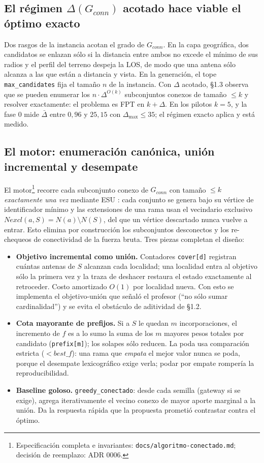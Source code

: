 \documentclass[12pt,letterpaper]{article}
\begin{document}
\subsection{El régimen $\Delta(G_{conn})$ acotado hace viable el óptimo exacto}
Dos rasgos de la instancia acotan el grado de $G_{conn}$. En la capa geográfica, dos candidatos se enlazan sólo si la distancia entre ambos no excede el mínimo de sus radios y el perfil del terreno despeja la LOS, de modo que una antena sólo alcanza a las que están a distancia y vista. En la generación, el tope \texttt{max\_candidates} fija el tamaño $n$ de la instancia. Con $\Delta$ acotado, \cite{itcs2026} §1.3 observa que se pueden enumerar los $n \cdot \Delta^{O(k)}$ subconjuntos conexos de tamaño $\le k$ y resolver exactamente: el problema es FPT en $k + \Delta$. En los pilotos $k = 5$, y la fase 0 mide $\bar{\Delta}$ entre $0{,}96$ y $25{,}15$ con $\Delta_{\max} \le 35$; el régimen exacto aplica y está medido.

\subsection{El motor: enumeración canónica, unión incremental y desempate}
El motor\footnote{Especificación completa e invariantes: \texttt{docs/algoritmo-conectado.md}; decisión de reemplazo: ADR 0006.} recorre cada subconjunto conexo de $G_{conn}$ con tamaño $\le k$ \emph{exactamente una vez} mediante ESU \cite{wernicke2006}: cada conjunto se genera bajo su vértice de identificador mínimo y las extensiones de una rama usan el vecindario exclusivo $\mathit{Nexcl}(a, S) = N(a) \setminus N(S)$, del que un vértice descartado nunca vuelve a entrar. Esto elimina por construcción los subconjuntos desconectos y los re-chequeos de conectividad de la fuerza bruta. Tres piezas completan el diseño:

\begin{itemize}
\item \textbf{Objetivo incremental como unión.} Contadores \texttt{cover[d]} registran cuántas antenas de $S$ alcanzan cada localidad; una localidad entra al objetivo sólo la primera vez y la traza de deshacer restaura el estado exactamente al retroceder. Costo amortizado $O(1)$ por localidad nueva. Con esto se implementa el objetivo-unión que señaló el profesor (``no sólo sumar cardinalidad'') y se evita el obstáculo de aditividad de \cite{itcs2026} §1.2.
\item \textbf{Cota mayorante de prefijos.} Si a $S$ le quedan $m$ incorporaciones, el incremento de $f$ es a lo sumo la suma de los $m$ mayores pesos totales por candidato (\texttt{prefix[m]}); los solapes sólo reducen. La poda usa comparación estricta ($< \mathit{best\_f}$): una rama que \emph{empata} el mejor valor nunca se poda, porque el desempate lexicográfico exige verla; podar por empate rompería la reproducibilidad.
\item \textbf{Baseline goloso.} \texttt{greedy\_conectado}: desde cada semilla (gateway si se exige), agrega iterativamente el vecino conexo de mayor aporte marginal a la unión. Da la respuesta rápida que la propuesta prometió contrastar contra el óptimo.
\end{itemize}
\end{document}
